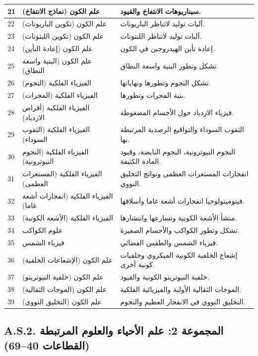 \documentclass[13pt,a4paper]{article}
\begin{document}
\begin{longtable}{|p{0.9cm}|p{6.0cm}|p{8.6cm}|}
		\hline
		21 & علم الكون (نماذج الانتفاخ) & سيناريوهات الانتفاخ والقيود. \\
		\hline
		22 & علم الكون (تكوين الباريونات) & آليات توليد لاتناظر الباريونات. \\
		\hline
		23 & علم الكون (تكوين اللبتونات) & آليات توليد لاتناظر اللبتونات. \\
		\hline
		24 & علم الكون (إعادة التأين) & إعادة تأين الهيدروجين في الكون. \\
		\hline
		25 & علم الكون (البنية واسعة النطاق) & تشكل وتطور البنية واسعة النطاق. \\
		\hline
		26 & الفيزياء الفلكية (النجوم) & تشكل النجوم وتطورها ونهاياتها. \\
		\hline
		27 & الفيزياء الفلكية (المجرات) & بنية المجرات وتطورها. \\
		\hline
		28 & الفيزياء الفلكية (أقراص الازدياد) & فيزياء الازدياد حول الأجسام المضغوطة. \\
		\hline
		29 & الفيزياء الفلكية (الثقوب السوداء) & الثقوب السوداء والتواقيع الرصدية المرتبطة بها. \\
		\hline
		30 & الفيزياء الفلكية (النجوم النيوترونية) & النجوم النيوترونية، النجوم النابضة، وقيود المادة الكثيفة. \\
		\hline
		31 & الفيزياء الفلكية (المستعرات العظمى) & انفجارات المستعرات العظمى ونواتج التخليق النووي. \\
		\hline
		32 & الفيزياء الفلكية (انفجارات أشعة غاما) & فينومينولوجيا انفجارات أشعة غاما وأسلافها. \\
		\hline
		33 & الفيزياء الفلكية (الأشعة الكونية) & منشأ الأشعة الكونية وتسارعها وانتشارها. \\
		\hline
		34 & علوم الكواكب & تشكل وتطور الكواكب والأجسام الصغيرة. \\
		\hline
		35 & فيزياء الشمس & فيزياء الشمس والطقس الفضائي. \\
		\hline
		36 & علم الكون (الإشعاعات الخلفية) & إشعاع الخلفية الكونية الميكروي وخلفيات كونية أخرى. \\
		\hline
		37 & علم الكون (خلفية النيوترينو) & خلفية النيوترينو الكونية والقيود. \\
		\hline
		38 & علم الكون (الموجات الثقالية) & الموجات الثقالية الأولية والفيزيائية الفلكية. \\
		\hline
		39 & علم الكون (التخليق النووي) & التخليق النووي في الانفجار العظيم والنجوم. \\
		\hline
	\end{longtable}
	
	\subsection*{A.S.2. المجموعة 2: علم الأحياء والعلوم المرتبطة (القطاعات 40--69)}
	
\end{document}

